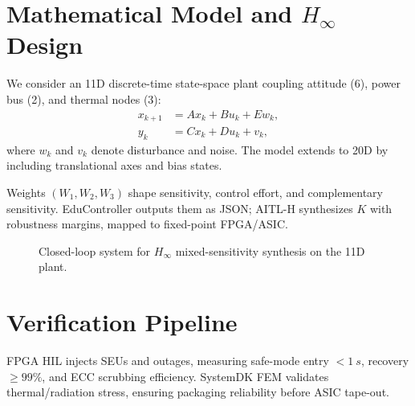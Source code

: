 \documentclass[conference]{IEEEtran}
\begin{document}
\section{Mathematical Model and $H_\infty$ Design}
We consider an 11D discrete-time state-space plant coupling attitude (6), power bus (2), and thermal nodes (3):
\begin{align}
  x_{k+1} &= A x_k + B u_k + E w_k, \\
  y_k &= C x_k + D u_k + v_k,
\end{align}
where $w_k$ and $v_k$ denote disturbance and noise. The model extends to 20D by including translational axes and bias states.

Weights $(W_1,W_2,W_3)$ shape sensitivity, control effort, and complementary sensitivity. EduController outputs them as JSON; AITL-H synthesizes $K$ with robustness margins, mapped to fixed-point FPGA/ASIC.

\begin{figure}[t]
\centering
{}
\caption{Closed-loop system for $H_\infty$ mixed-sensitivity synthesis on the 11D plant.}
\label{fig:loop}
\end{figure}

\section{Verification Pipeline}
FPGA HIL injects SEUs and outages, measuring safe-mode entry $< \SI{1}{s}$, recovery $\ge 99\%$, and ECC scrubbing efficiency. SystemDK FEM validates thermal/radiation stress, ensuring packaging reliability before ASIC tape-out.

\end{document}
